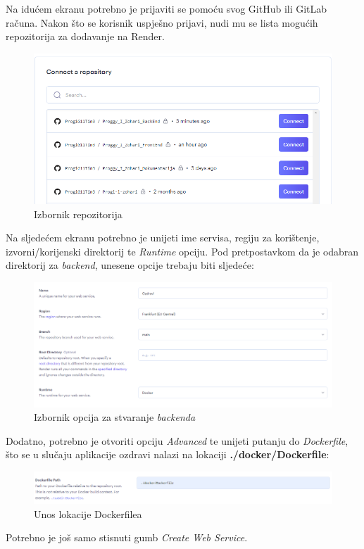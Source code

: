 			Na idućem ekranu potrebno je prijaviti se pomoću svog GitHub ili GitLab računa. Nakon što se korisnik uspješno prijavi, nudi mu se lista mogućih repozitorija za dodavanje na Render.
			\begin{figure}[H]
				\includegraphics[scale=0.7]{slike/render2.PNG} %
				\centering
				\caption{Izbornik repozitorija}
				\label{fig:render2}
			\end{figure}
			Na sljedećem ekranu potrebno je unijeti ime servisa, regiju za korištenje, izvorni/korijenski direktorij te \textit{Runtime} opciju. Pod pretpostavkom da je odabran direktorij za \textit{backend}, unesene opcije trebaju biti sljedeće:
			\begin{figure}[H]
				\includegraphics[scale=0.7]{slike/render3.PNG} %
				\centering
				\caption{Izbornik opcija za stvaranje \textit{backenda}}
				\label{fig:render3}
			\end{figure}
			Dodatno, potrebno je otvoriti opciju \textit{Advanced} te unijeti putanju do \textit{Dockerfile}, što se u slučaju aplikacije ozdravi nalazi na lokaciji \textbf{./docker/Dockerfile}:
			\begin{figure}[H]
				\includegraphics[scale=0.7]{slike/render4.PNG} %
				\centering
				\caption{Unos lokacije Dockerfilea}
				\label{fig:render4}
			\end{figure}
			Potrebno je još samo stisnuti gumb \textit{Create Web Service}. \clearpage
			\eject
			
